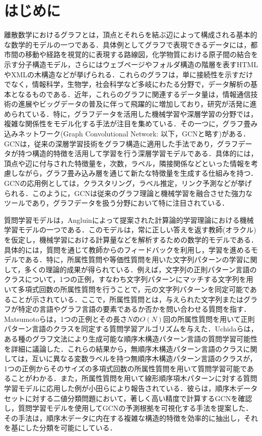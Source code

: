 \section{はじめに}
離散数学におけるグラフとは，頂点とそれらを結ぶ辺によって構成される基本的な数学的モデルの一つである．具体例としてグラフで表現できるデータには，都市間の移動や経路を視覚的に表現する路線図，化学物質における原子間の結合を示す分子構造モデル，さらにはウェブページやフォルダ構造の階層を表すHTMLやXMLの木構造などが挙げられる．これらのグラフは，単に接続性を示すだけでなく，情報科学，生物学，社会科学など多岐にわたる分野で，データ解析の基本となるものである．近年，これらのグラフに関連するデータ量は，情報通信技術の進展やビッグデータの普及に伴って飛躍的に増加しており，研究が活発に進められている．特に，グラフデータを活用した機械学習や深層学習の分野では，複雑な関係性をモデル化する手法が注目を集めている．その一つに，グラフ畳み込みネットワーク(Graph Convolutional Network: 以下，GCNと略す)がある．GCNは，従来の深層学習技術をグラフ構造に適用した手法であり，グラフデータが持つ構造的特徴を活用して学習を行う深層学習モデルである．具体的には，頂点や辺に付与された特徴量を，次数，ラベル，隣接関係などといった情報を考慮しながら，グラフ畳み込み層を通じて新たな特徴量を生成する仕組みを持つ．GCNの応用例としては，クラスタリング，ラベル推定，リンク予測などが挙げられる．このように，GCNは従来のグラフ理論と機械学習を融合させた強力なツールであり，グラフデータを扱う分野において特に注目されている．

質問学習モデルは，Angluin\cite{angluin-ml1988}によって提案された計算論的学習理論における機械学習モデルの一つである．このモデルは，常に正しい答えを返す教師(オラクル)を仮定し，機械学習における計算量などを解析するための数学的モデルである．具体的には，質問を通じて教師からのフィードバックを利用し，学習を進めるモデルである．特に，所属性質問や等価性質問を用いた文字列パターンの学習に関して，多くの理論的成果が得られている．例えば，文字列の正則パターン言語のクラスについて，1つの正例，すなわち文字列パターンにマッチする文字列を用いて多項式回数の所属性質問を行うことで，元の文字列パターンを同定可能であることが示されている\cite{angluin-jcss1980,angluin-ic1987}．ここで，所属性質問とは，与えられた文字列またはグラフが特定の言語やグラフ言語の要素であるか否かを問い合わせる質問を指す．Matsumotoら\cite{matsumoto-ieice2020}は，1つの正例とその長さ$N$の$O(N)$回の所属性質問を用いて正則パターン言語のクラスを同定する質問学習アルゴリズムを与えた．Uchidaら\cite{uchida2014,uchida-ieice2019}は，ある種のグラフ文法により生成可能な順序木構造パターン言語の質問学習可能性を詳細に議論した．これらの結果から，無順序木構造パターン言語のクラスに関しては，互いに異なる変数ラベルを持つ無順序木構造パターン言語のクラスが，1つの正例からそのサイズの多項式回数の所属性質問を用いて質問学習可能であることがわかる．また，所属性質問を用いて線形順序項木パターンに対する質問学習モデルに応用した例が小田ら\cite{oda-ai2022}により報告されている．彼らは，順序木データセットに対する二値分類問題において，著しく高い精度で計算するGCNを確認し，質問学習モデルを使用してGCNの予測根拠を可視化する手法を提案した．その手法は，順序木データに内在する複雑な構造的特徴を効率的に抽出し，それを基にした分類を可能にしている．


